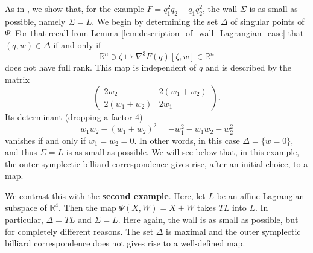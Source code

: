 \documentclass[12pt]{article}
\newcommand{\R}{{\mathbb R}}
\begin{document}
As in \cite{FT2}, we show that, for the example $F=q_1^2q_2+q_1q_2^2$, the wall $\Sigma$ is as small as possible, namely $\Sigma=L$. We begin by determining the set $\Delta$ of singular points of $\Psi$.
For that recall from Lemma \ref{lem:description_of_wall_Lagrangian_case} that $(q,w)\in\Delta$ if and only if
\begin{equation}\nonumber
\R^n\ni\zeta\mapsto \nabla^3F(q)[\zeta,w]\in\R^n
\end{equation}
does not have full rank. %
This map is independent of $q$ and is described by the matrix
\begin{equation}\nonumber
\begin{pmatrix}
2w_2 & 2(w_1+w_2)\\
2(w_1+w_2) & 2w_1 
\end{pmatrix}.
\end{equation}
Its determinant (dropping a factor 4)
\begin{equation}\nonumber
w_1w_2-(w_1+w_2)^2=-w_1^2-w_1w_2-w_2^2
\end{equation}
vanishes if and only if $w_1=w_2=0$. In other words, in this case $\Delta=\{w=0\}$, and thus $\Sigma=L$ is as small as possible. We will see below that, in this example, the outer symplectic billiard correspondence gives rise, after an initial choice, to a map.

\bigskip

We contrast this with the \textbf{second example}. Here, let $L$ be an affine Lagrangian subspace of $\R^4$. Then the map $\Psi(X,W)=X+W$ takes $TL$ into $L$. In particular, $\Delta=TL$ and $\Sigma=L$. Here again, the wall is as small as possible, but for completely different reasons. The set $\Delta$ is maximal and the outer symplectic billiard correspondence does not gives rise to a well-defined map.

\bigskip
\end{document}
